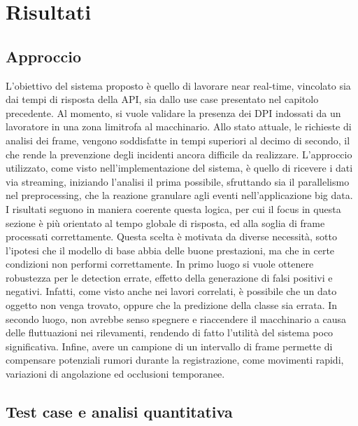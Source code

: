 \chapter{Risultati}

\section{Approccio}
L'obiettivo del sistema proposto è quello di lavorare near real-time, vincolato sia dai tempi di risposta della API, sia dallo use case presentato nel capitolo precedente. Al momento, si vuole validare la presenza dei DPI indossati da un lavoratore in una zona limitrofa al macchinario.%
Allo stato attuale, le richieste di analisi dei frame, vengono soddisfatte in tempi superiori al decimo di secondo, il che rende la prevenzione degli incidenti ancora difficile da realizzare. L'approccio utilizzato, come visto nell'implementazione del sistema, è quello di ricevere i dati via streaming, iniziando l'analisi il prima possibile, sfruttando sia il parallelismo nel preprocessing, che la reazione granulare agli eventi nell'applicazione big data. I risultati seguono in maniera coerente questa logica, per cui il focus in questa sezione è più orientato al tempo globale di risposta, ed alla soglia di frame processati correttamente. Questa scelta è motivata da diverse necessità, sotto l'ipotesi che il modello di base abbia delle buone prestazioni, ma che in certe condizioni non performi correttamente. In primo luogo si vuole ottenere robustezza per le detection errate, effetto della generazione di falsi positivi e negativi. Infatti, come visto anche nei lavori correlati, è possibile che un dato oggetto non venga trovato, oppure che la predizione della classe sia errata. In secondo luogo, non avrebbe senso spegnere e riaccendere il macchinario a causa delle fluttuazioni nei rilevamenti, rendendo di fatto l'utilità del sistema poco significativa. Infine, avere un campione di un intervallo di frame permette di compensare potenziali rumori durante la registrazione, come movimenti rapidi, variazioni di angolazione ed occlusioni temporanee. 



\section{Test case e analisi quantitativa}

